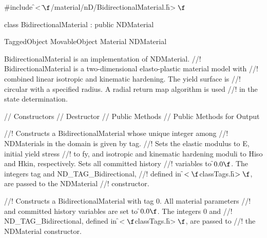 \indent \#include \f$<\tilde{ }\f$/material/nD/BidirectionalMaterial.h\f$>\f$

\indent class BidirectionalMaterial : public NDMaterial

\indent TaggedObject
\indent MovableObject
\indent\indent Material
\indent\indent\indent NDMaterial
\indent\indent\indent{}

\indent BidirectionalMaterial is an implementation of NDMaterial. 
//! BidirectionalMaterial is a two-dimensional elasto-plastic material model with
//! combined linear isotropic and kinematic hardening. The yield surface is
//! circular with a specified radius. A radial return map algorithm is used
//! in the state determination.

\indent // Constructors
\indent // Destructor
\indent // Public Methods
\indent // Public Methods for Output

//! Constructs a BidirectionalMaterial whose unique integer among
//! NDMaterials in the domain is given by \p tag.
//! Sets the elastic modulus to \p E, initial yield stress
//! to \p fy, and isotropic and kinematic hardening moduli to 
\p Hiso and \p Hkin, respectively. Sets all committed history
//! variables to \f$0.0\f$. The integers \p tag and ND\_TAG\_Bidirectional, 
//! defined in \f$<\f$classTags.h\f$>\f$, are passed to the NDMaterial 
//! constructor. 

//! Constructs a BidirectionalMaterial with tag 0. All material parameters
//! and committed history variables are set to \f$0.0\f$. The integers 0 and 
//! ND\_TAG\_Bidirectional, defined in \f$<\f$classTags.h\f$>\f$, are passed to 
//! the NDMaterial constructor. 

